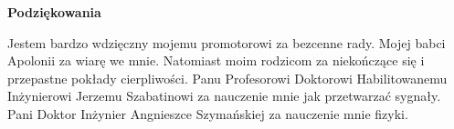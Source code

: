 \newpage
    \begin{center}
	{\large\bfseries Podziękowania}\par\bigskip\end{center}
Jestem bardzo wdzięczny	mojemu promotorowi za bezcenne rady.
Mojej babci Apolonii za wiarę we mnie.
Natomiast moim rodzicom za niekończące się i przepastne pokłady cierpliwości.
Panu Profesorowi Doktorowi Habilitowanemu Inżynierowi Jerzemu Szabatinowi za nauczenie mnie jak przetwarzać sygnały.
Pani Doktor Inżynier Angnieszce Szymańskiej za nauczenie mnie fizyki.
